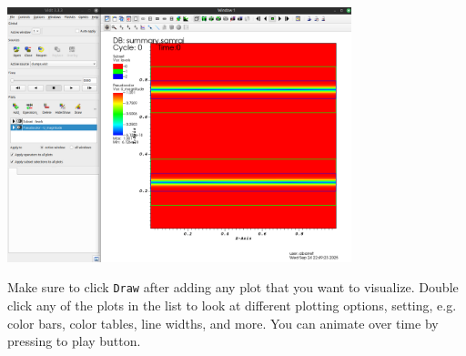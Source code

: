 \documentclass{article}
\begin{document}
\begin{center}
\includegraphics[width=0.75\textwidth]{Graphs/visit_u_mag.png}
\end{center}
Make sure to click \verb|Draw| after adding any plot that you want to visualize. Double click any of the plots in the list to look at different plotting options, setting, e.g. color bars, color tables, line widths, and more. You can animate over time by pressing to play button.
\end{document}
